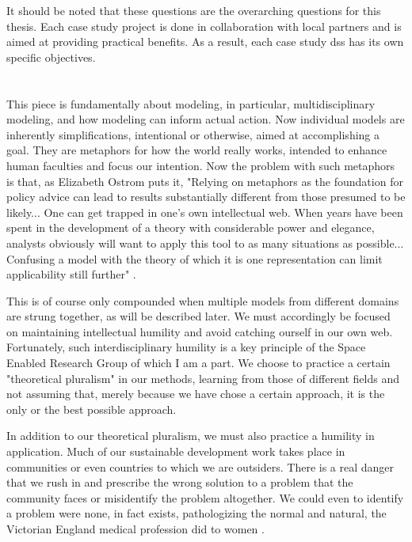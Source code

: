 It should be noted that these questions are the overarching questions for this thesis. Each case study project is done in collaboration with local partners and is aimed at providing practical benefits. As a result, each case study \ac{dss} has its own specific objectives.

\section{}

This piece is fundamentally about modeling, in particular, multidisciplinary modeling, and how modeling can inform actual action. Now individual models are inherently simplifications, intentional or otherwise, aimed at accomplishing a goal. They are metaphors for how the world really works, intended to enhance human faculties and focus our intention. Now the problem with such metaphors is that, as Elizabeth Ostrom puts it, "Relying on metaphors as the foundation for policy advice can lead to results substantially different from those presumed to be likely... One can get trapped in one's own intellectual web. When years have been spent in the development of a theory with considerable power and elegance, analysts obviously will want to apply this tool to as many situations as possible... Confusing a model with the theory of which it is one representation can limit applicability still further" \cite{ostromGoverningCommonsEvolution2015}. 

This is of course only compounded when multiple models from different domains are strung together, as will be described later. We must accordingly be focused on maintaining intellectual humility and avoid catching ourself in our own web. Fortunately, such interdisciplinary humility is a key principle of the Space Enabled Research Group of which I am a part. We choose to practice a certain "theoretical pluralism" \cite{turkleEmpathyDiariesMemoir2021} in our methods, learning from those of different fields and not assuming that, merely because we have chose a certain approach, it is the only or the best possible approach.

In addition to our theoretical pluralism, we must also practice a humility in application. Much of our sustainable development work takes place in communities or even countries to which we are outsiders. There is a real danger that we rush in and prescribe the wrong solution to a problem that the community faces or misidentify the problem altogether. We could even to identify a problem were none, in fact exists, pathologizing the normal and natural, the Victorian England medical profession did to women \cite{duffinConspicuousConsumptiveWoman2012}. 

